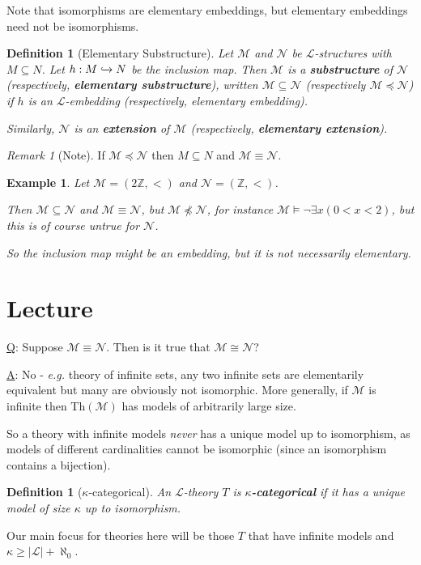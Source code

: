 \documentclass[]{article}
\theoremstyle{custhm}
\theoremstyle{cusdef}
\newtheorem{defin}[theorem]{Definition}
\theoremstyle{custhm}
\theoremstyle{custhm}
\theoremstyle{custhm}
\theoremstyle{ex}
\newtheorem{ex}[theorem]{Example}
\theoremstyle{custhm}
\theoremstyle{cusdef}
\theoremstyle{remark}
\newtheorem*{remark*}{Remark}
\theoremstyle{remark}
\theoremstyle{numremark}
\newcommand{\Z}{\mathbb{Z}}
\newcommand{\undf}[1]{\textit{\textbf{#1}}}
\renewcommand{\L}{\mathcal{L}}
\renewcommand{\it}[1]{\textit{#1}}
\newcommand{\M}{\mathcal{M}}
\newcommand{\N}{\mathcal{N}}
\renewcommand{\subset}{\subseteq}
\begin{document}
Note that isomorphisms are elementary embeddings, but elementary embeddings need not be isomorphisms.

\begin{defin}[Elementary Substructure]
Let $\M$ and $\N$ be $\L$-structures with $M\subset N$. Let $h:M \xhookrightarrow{} N$ be the inclusion map. Then $\M$ is a \undf{substructure} of $\N$ (respectively, \undf{elementary substructure}), written $\M\subset \N$ (respectively $\M\preceq\N$) if $h$ is an $\L$-embedding (respectively, elementary embedding).

Similarly, $\N$ is an \undf{extension} of $\M$ (respectively, \undf{elementary extension}).
\end{defin}	

\begin{remark*}[Note]
If $\M\preceq\N$ then $M\subset N$ and $\M\equiv \N$.
\end{remark*}
\begin{ex}
Let $\M = (2\Z, <)$ and $\N = (\Z, <)$.

Then $\M \subset \N$ and $\M \equiv \N$, but $\M\not\preceq\N$, for instance $\M\models \neg\exists x(0 < x < 2)$, but this is of course untrue for $\N$.

So the inclusion map might be an embedding, but it is not necessarily elementary.
\end{ex}


\section{Lecture}

\underline{Q}: Suppose $\M\equiv\N$. Then is it true that $\M \cong \N$?

\underline{A}: No - \it{e.g.} theory of infinite sets, any two infinite sets are elementarily equivalent but many are obviously not isomorphic. More generally, if $\M$ is infinite then Th$(\M)$ has models of arbitrarily large size.

So a theory with infinite models \it{never} has a unique model up to isomorphism, as models of different cardinalities cannot be isomorphic (since an isomorphism contains a bijection).

\begin{defin}[$\kappa$-categorical]
An $\L$-theory $T$ is \undf{$\kappa$-categorical} if it has a unique model of size $\kappa$ up to isomorphism.
\end{defin}
Our main focus for theories here will be those $T$ that have infinite models and $\kappa \ge |\L| + \aleph_0$.
\end{document}
